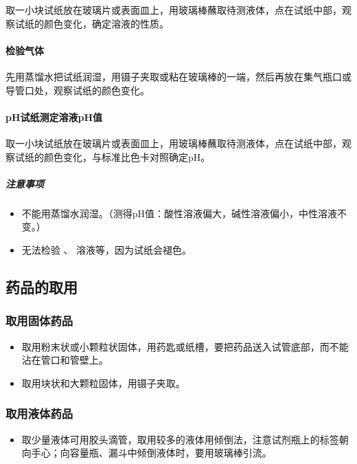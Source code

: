 \documentclass[10pt]{article}
\begin{document}
	取一小块试纸放在玻璃片或表面皿上，用玻璃棒蘸取待测液体，点在试纸中部，观察试纸的颜色变化，确定溶液的性质。
	
	\paragraph{检验气体}
	
	先用蒸馏水把试纸润湿，用镊子夹取或粘在玻璃棒的一端，然后再放在集气瓶口或导管口处，观察试纸的颜色变化。
	
	\paragraph{pH试纸测定溶液pH值}	
	
	取一小块试纸放在玻璃片或表面皿上，用玻璃棒蘸取待测液体，点在试纸中部，观察试纸的颜色变化，与标准比色卡对照确定pH。
	
	\subparagraph{注意事项}
	
	\begin{itemize}
		\item 不能用蒸馏水润湿。（测得pH值：酸性溶液偏大，碱性溶液偏小，中性溶液不变。）
		\item 无法检验 、 溶液等，因为试纸会褪色。
	\end{itemize}
	
	

	
	\subsection{药品的取用}
	
	\subsubsection{取用固体药品}
	
	\begin{itemize}
		\item 取用粉末状或小颗粒状固体，用药匙或纸槽，要把药品送入试管底部，而不能沾在管口和管壁上。
		\item 取用块状和大颗粒固体，用镊子夹取。
	\end{itemize}
	
	\subsubsection{取用液体药品}
	
	\begin{itemize}
		\item 取少量液体可用胶头滴管，取用较多的液体用倾倒法，注意试剂瓶上的标签朝向手心；向容量瓶、漏斗中倾倒液体时，要用玻璃棒引流。
	\end{itemize}
	
\end{document}
